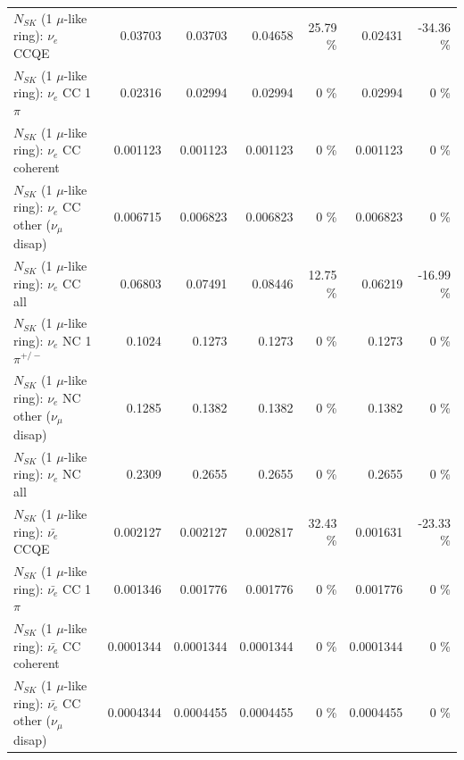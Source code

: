 \begin{table}
\begin{tabular}{| l | r | r | r  r | r  r |}
\hline
\hline
\hline
                                      $N_{SK}$ (1 $\mu$-like ring): $\nu_e$ CCQE &         0.03703 &         0.03703 &         0.04658 &    25.79 \%  &         0.02431 &   -34.36 \%  \\ 
                                 $N_{SK}$ (1 $\mu$-like ring): $\nu_e$ CC 1$\pi$ &         0.02316 &         0.02994 &         0.02994 &        0 \%  &         0.02994 &        0 \%  \\ 
                               $N_{SK}$ (1 $\mu$-like ring): $\nu_e$ CC coherent &        0.001123 &        0.001123 &        0.001123 &        0 \%  &        0.001123 &        0 \%  \\ 
                $N_{SK}$ (1 $\mu$-like ring): $\nu_e$ CC other ($\nu_\mu$ disap) &        0.006715 &        0.006823 &        0.006823 &        0 \%  &        0.006823 &        0 \%  \\ 
                                  $N_{SK}$ (1 $\mu$-like ring): $\nu_{e}$ CC all &         0.06803 &         0.07491 &         0.08446 &    12.75 \%  &         0.06219 &   -16.99 \%  \\ 
\hline
                           $N_{SK}$ (1 $\mu$-like ring): $\nu_e$ NC 1$\pi^{+/-}$ &          0.1024 &          0.1273 &          0.1273 &        0 \%  &          0.1273 &        0 \%  \\ 
                $N_{SK}$ (1 $\mu$-like ring): $\nu_e$ NC other ($\nu_\mu$ disap) &          0.1285 &          0.1382 &          0.1382 &        0 \%  &          0.1382 &        0 \%  \\ 
                                  $N_{SK}$ (1 $\mu$-like ring): $\nu_{e}$ NC all &          0.2309 &          0.2655 &          0.2655 &        0 \%  &          0.2655 &        0 \%  \\ 
\hline
\hline
\hline
                                $N_{SK}$ (1 $\mu$-like ring): $\bar{\nu_e}$ CCQE &        0.002127 &        0.002127 &        0.002817 &    32.43 \%  &        0.001631 &   -23.33 \%  \\ 
                           $N_{SK}$ (1 $\mu$-like ring): $\bar{\nu_e}$ CC 1$\pi$ &        0.001346 &        0.001776 &        0.001776 &        0 \%  &        0.001776 &        0 \%  \\ 
                         $N_{SK}$ (1 $\mu$-like ring): $\bar{\nu_e}$ CC coherent &       0.0001344 &       0.0001344 &       0.0001344 &        0 \%  &       0.0001344 &        0 \%  \\ 
          $N_{SK}$ (1 $\mu$-like ring): $\bar{\nu_e}$ CC other ($\nu_\mu$ disap) &       0.0004344 &       0.0004455 &       0.0004455 &        0 \%  &       0.0004455 &        0 \%  \\ 

\end{tabular}
\end{table}

